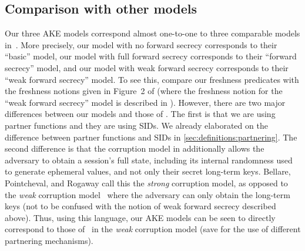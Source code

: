   


\subsection{Comparison with other models}
Our three AKE models correspond almost one-to-one to three comparable models in~\cite{EC:BelPoiRog00}.
More precisely,
our \akenfstext model with no forward secrecy corresponds to their ``basic'' model,
our \akefstext model with full forward secrecy corresponds to their ``forward secrecy'' model,
and our \akewfstext model with weak forward secrecy corresponds to their ``weak forward secrecy'' model.
To see this, compare our freshness predicates with the freshness notions given in Figure~2  of \cite{EC:BelPoiRog00} 
(where the freshness notion for the ``weak forward secrecy'' model is  described in \cite[Remark~7]{EC:BelPoiRog00}).
However,
there are two major differences between our models and those of \cite{EC:BelPoiRog00}.
The first is that we are using partner functions and they are using SIDs.
We already elaborated on the difference between partner functions and SIDs in \cref{sec:definitions:partnering}.
The second difference is that the corruption model in \cite{EC:BelPoiRog00} additionally allows the adversary to obtain a session's full state,
including its internal randomness used to generate ephemeral values,
and not only their secret long-term keys.
Bellare, Pointcheval, and Rogaway call this the \emph{strong} corruption model,
as opposed to the \emph{weak} corruption model~\cite[Remark~3]{EC:BelPoiRog00} where the adversary can only obtain the long-term keys
(not to be confused with the notion of weak forward secrecy described above).
Thus,
using this language,
our AKE models can be seen to directly correspond to those of~\cite{EC:BelPoiRog00} in the \emph{weak} corruption model
(save for the use of different partnering mechanisms).

